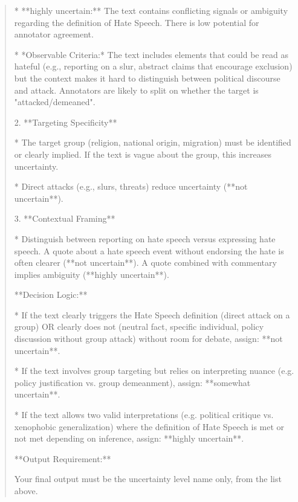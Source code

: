 \begin{quote}
    *   **highly uncertain:** The text contains conflicting signals or ambiguity regarding the definition of Hate Speech. There is low potential for annotator agreement.

        *   *Observable Criteria:* The text includes elements that could be read as hateful (e.g., reporting on a slur, abstract claims that encourage exclusion) but the context makes it hard to distinguish between political discourse and attack. Annotators are likely to split on whether the target is "attacked/demeaned".



2.  **Targeting Specificity**

    *   The target group (religion, national origin, migration) must be identified or clearly implied. If the text is vague about the group, this increases uncertainty.

    *   Direct attacks (e.g., slurs, threats) reduce uncertainty (**not uncertain**).



3.  **Contextual Framing**

    *   Distinguish between reporting on hate speech versus expressing hate speech. A quote about a hate speech event without endorsing the hate is often clearer (**not uncertain**). A quote combined with commentary implies ambiguity (**highly uncertain**).



**Decision Logic:**



*   If the text clearly triggers the Hate Speech definition (direct attack on a group) OR clearly does not (neutral fact, specific individual, policy discussion without group attack) without room for debate, assign: **not uncertain**.

*   If the text involves group targeting but relies on interpreting nuance (e.g. policy justification vs. group demeanment), assign: **somewhat uncertain**.

*   If the text allows two valid interpretations (e.g. political critique vs. xenophobic generalization) where the definition of Hate Speech is met or not met depending on inference, assign: **highly uncertain**.



**Output Requirement:**

Your final output must be the uncertainty level name only, from the list above.
\end{quote}

